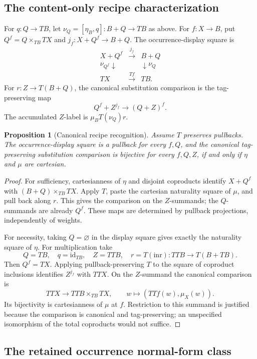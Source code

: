 \documentclass[11pt,a4paper]{article}
\newtheorem{proposition}[theorem]{Proposition}
\theoremstyle{definition}
\newcommand{\id}{\mathrm{id}}
\newcommand{\inr}{\mathrm{inr}}
\begin{document}
\subsection{The content-only recipe characterization}\label{rb:recipe}

For $q:Q\to TB$, let $\nu_Q=[\eta_B,q]:B+Q\to TB$ as above. For
$f:X\to B$, put $Q^f=Q\times_{TB}TX$ and
$j_f:X+Q^f\to B+Q$. The occurrence-display square is
\[
\begin{array}{ccc}
X+Q^f&\xrightarrow{j_f}&B+Q\\
\nu_{Q^f}\downarrow&&\downarrow\nu_Q\\
TX&\xrightarrow{Tf}&TB.
\end{array}
\]
For $r:Z\to T(B+Q)$, the canonical substitution comparison is the
tag-preserving map
\[
 Q^f+Z^{j_f}\longrightarrow(Q+Z)^f.
\]
The accumulated $Z$-label is $\mu_BT(\nu_Q)r$.

\begin{proposition}[Canonical recipe recognition]\label{rb:recipe-iff}
Assume $T$ preserves pullbacks. The occurrence-display square is a pullback
for every $f,Q$, and the canonical tag-preserving substitution comparison
is bijective for every $f,Q,Z$, if and only if $\eta$ and $\mu$ are
cartesian.
\end{proposition}
\begin{proof}
For sufficiency, cartesianness of $\eta$ and disjoint coproducts identify
$X+Q^f$ with $(B+Q)\times_{TB}TX$. Apply $T$, paste the cartesian
naturality square of $\mu$, and pull back along $r$. This gives the
comparison on the $Z$-summands; the $Q$-summands are already $Q^f$.
These maps are determined by pullback projections, independently of weights.

For necessity, taking $Q=\varnothing$ in the display square gives exactly
the naturality square of $\eta$. For multiplication take
\[
 Q=TB,\quad q=\id_{TB},\quad Z=TTB,\quad
 r=T(\inr):TTB\longrightarrow T(B+TB).
\]
Then $Q^f=TX$. Applying pullback-preserving $T$ to the square of coproduct
inclusions identifies $Z^{j_f}$ with $TTX$. On the $Z$-summand the
canonical comparison is
\[
 TTX\longrightarrow TTB\times_{TB}TX,\qquad
 w\longmapsto(TTf(w),\mu_X(w)).
\]
Its bijectivity is cartesianness of $\mu$ at $f$. Restriction to this
summand is justified because the comparison is canonical and tag-preserving;
an unspecified isomorphism of the total coproducts would not suffice.
\end{proof}

\subsection{The retained occurrence normal-form class}\label{rb:class}
\end{document}
